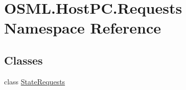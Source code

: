 \hypertarget{namespaceOSML_1_1HostPC_1_1Requests}{}\section{O\+S\+M\+L.\+Host\+P\+C.\+Requests Namespace Reference}
\label{namespaceOSML_1_1HostPC_1_1Requests}
\subsection*{Classes}
\begin{DoxyCompactItemize}
\item 
class \mbox{\hyperlink{classOSML_1_1HostPC_1_1Requests_1_1StateRequests}{State\+Requests}}
\end{DoxyCompactItemize}
